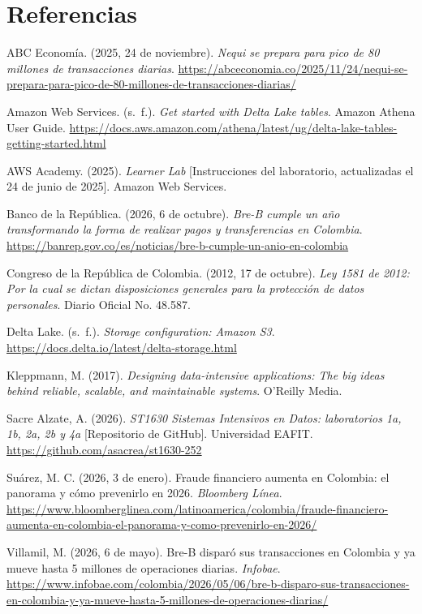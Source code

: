 \documentclass[12pt,letterpaper]{article}
\begin{document}
\section*{Referencias}
\begin{footnotesize}
\setlength{\parindent}{0pt}\setlength{\parskip}{3pt}

ABC Economía. (2025, 24 de noviembre). \emph{Nequi se prepara para pico de 80 millones de transacciones diarias}. \url{https://abceconomia.co/2025/11/24/nequi-se-prepara-para-pico-de-80-millones-de-transacciones-diarias/}

Amazon Web Services. (s.~f.). \emph{Get started with Delta Lake tables}. Amazon Athena User Guide. \url{https://docs.aws.amazon.com/athena/latest/ug/delta-lake-tables-getting-started.html}

AWS Academy. (2025). \emph{Learner Lab} [Instrucciones del laboratorio, actualizadas el 24 de junio de 2025]. Amazon Web Services.

Banco de la República. (2026, 6 de octubre). \emph{Bre-B cumple un año transformando la forma de realizar pagos y transferencias en Colombia}. \url{https://banrep.gov.co/es/noticias/bre-b-cumple-un-anio-en-colombia}

Congreso de la República de Colombia. (2012, 17 de octubre). \emph{Ley 1581 de 2012: Por la cual se dictan disposiciones generales para la protección de datos personales}. Diario Oficial No. 48.587.

Delta Lake. (s.~f.). \emph{Storage configuration: Amazon S3}. \url{https://docs.delta.io/latest/delta-storage.html}

Kleppmann, M. (2017). \emph{Designing data-intensive applications: The big ideas behind reliable, scalable, and maintainable systems}. O'Reilly Media.

Sacre Alzate, A. (2026). \emph{ST1630 Sistemas Intensivos en Datos: laboratorios 1a, 1b, 2a, 2b y 4a} [Repositorio de GitHub]. Universidad EAFIT. \url{https://github.com/asacrea/st1630-252}

Suárez, M. C. (2026, 3 de enero). Fraude financiero aumenta en Colombia: el panorama y cómo prevenirlo en 2026. \emph{Bloomberg Línea}. \url{https://www.bloomberglinea.com/latinoamerica/colombia/fraude-financiero-aumenta-en-colombia-el-panorama-y-como-prevenirlo-en-2026/}

Villamil, M. (2026, 6 de mayo). Bre-B disparó sus transacciones en Colombia y ya mueve hasta 5 millones de operaciones diarias. \emph{Infobae}. \url{https://www.infobae.com/colombia/2026/05/06/bre-b-disparo-sus-transacciones-en-colombia-y-ya-mueve-hasta-5-millones-de-operaciones-diarias/}\par
\end{footnotesize}
\end{document}
